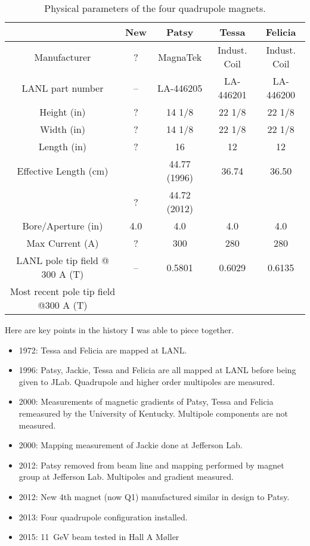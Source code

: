 \documentclass[12pt]{article}
\begin{document}
\begin{table}[ht]
\begin{center}
\caption{\label{tab:nomen}Physical parameters of the four quadrupole magnets.}
\begin{tabular}{|c|c|c|c|c|}
\hline
~&New&Patsy&Tessa&Felicia\\ \hline
Manufacturer&?&MagnaTek&Indust. Coil&Indust. Coil\\ \hline
LANL part number&--&LA-446205&LA-446201&LA-446200\\ \hline
Height (in)& ?&14 1/8&22 1/8&22 1/8\\ \hline
Width (in)&?&14 1/8&22 1/8&22 1/8\\ \hline
Length (in) &?&16 &12&12\\ \hline
Effective Length (cm)& &44.77 (1996)&36.74&36.50\\ 
~& ?&44.72 (2012)&~&~\\ \hline
Bore/Aperture (in) & 4.0 & 4.0&4.0&4.0\\ \hline
Max Current (A) &?&300&280&280\\ \hline
LANL pole tip field @ 300 A (T)&--&0.5801&0.6029&0.6135\\ \hline
Most recent pole tip field @300 A (T)\\ \hline
\end{tabular}
\end{center}
\end{table}

 Here are key points in the history I was able to piece together.
\begin{itemize}
\item{1972: Tessa and Felicia are mapped at LANL.}
\item{1996: Patsy, Jackie, Tessa and Felicia are all mapped at LANL before being given to JLab. Quadrupole and higher order multipoles are measured.}
\item{2000: Measurements of magnetic gradients of Patsy, Tessa and Felicia remeasured by the University of Kentucky. Multipole components are not measured.}
\item{2000: Mapping measurement of Jackie done at Jefferson Lab.}
\item{2012: Patsy removed from beam line and mapping performed by magnet group at Jefferson Lab. Multipoles and gradient measured.}
\item{2012: New 4th magnet (now Q1) manufactured similar in design to Patsy.}
\item{2013: Four quadrupole configuration installed.}
\item{2015: 11~GeV beam tested in Hall A M\o ller}
\end{itemize}
\end{document}
